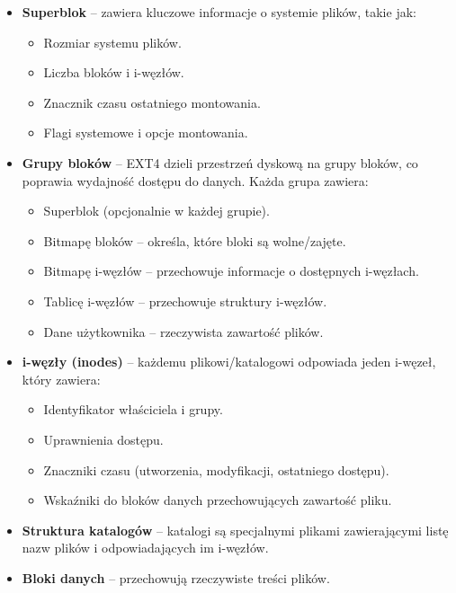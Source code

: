 \begin{itemize}
    \item \textbf{Superblok} – zawiera kluczowe informacje o systemie plików, takie jak:
    \begin{itemize}
        \item Rozmiar systemu plików.
        \item Liczba bloków i i-węzłów.
        \item Znacznik czasu ostatniego montowania.
        \item Flagi systemowe i opcje montowania.
    \end{itemize}

    \item \textbf{Grupy bloków} – EXT4 dzieli przestrzeń dyskową na grupy bloków, co poprawia wydajność dostępu do danych. Każda grupa zawiera:
    \begin{itemize}
        \item Superblok (opcjonalnie w każdej grupie).
        \item Bitmapę bloków – określa, które bloki są wolne/zajęte.
        \item Bitmapę i-węzłów – przechowuje informacje o dostępnych i-węzłach.
        \item Tablicę i-węzłów – przechowuje struktury i-węzłów.
        \item Dane użytkownika – rzeczywista zawartość plików.
    \end{itemize}

    \item \textbf{i-węzły (inodes)} – każdemu plikowi/katalogowi odpowiada jeden i-węzeł, który zawiera:
    \begin{itemize}
        \item Identyfikator właściciela i grupy.
        \item Uprawnienia dostępu.
        \item Znaczniki czasu (utworzenia, modyfikacji, ostatniego dostępu).
        \item Wskaźniki do bloków danych przechowujących zawartość pliku.
    \end{itemize}

    \item \textbf{Struktura katalogów} – katalogi są specjalnymi plikami zawierającymi listę nazw plików i odpowiadających im i-węzłów.

    \item \textbf{Bloki danych} – przechowują rzeczywiste treści plików.
\end{itemize}


